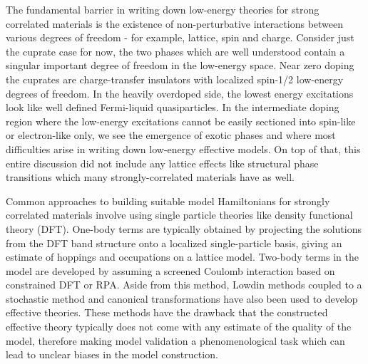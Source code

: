 \documentclass[12pt]{article}
\begin{document}
The fundamental barrier in writing down low-energy theories for strong correlated materials is the existence of non-perturbative interactions between various degrees of freedom - for example, lattice, spin and charge. 
Consider just the cuprate case for now, the two phases which are well understood contain a singular important degree of freedom in the low-energy space. 
Near zero doping the cuprates are charge-transfer insulators with localized spin-1/2 low-energy degrees of freedom. In the heavily overdoped side, the lowest energy excitations look like well defined Fermi-liquid quasiparticles. 
In the intermediate doping region where the low-energy excitations cannot be easily sectioned into spin-like or electron-like only, we see the emergence of exotic phases and where most difficulties arise in writing down low-energy effective models. 
On top of that, this entire discussion did not include any lattice effects like structural phase transitions which many strongly-correlated materials have as well.

Common approaches to building suitable model Hamiltonians for strongly correlated materials involve using single particle theories like density functional theory (DFT).
One-body terms are typically obtained by projecting the solutions from the DFT band structure onto a localized single-particle basis, giving an estimate of hoppings and occupations on a lattice model.
Two-body terms in the model are developed by assuming a screened Coulomb interaction based on constrained DFT or RPA.
Aside from this method, Lowdin methods coupled to a stochastic method and canonical transformations have also been used to develop effective theories.
These methods have the drawback that the constructed effective theory typically does not come with any estimate of the quality of the model, therefore making model validation a phenomenological task which can lead to unclear biases in the model construction.
\end{document}
